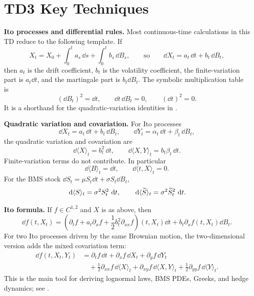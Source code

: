 \section{TD3 Key Techniques}

\begin{techniques}
  \item \textbf{Ito processes and differential rules.}
  Most continuous-time calculations in this TD reduce to the following
  template.  If
  \[
    X_t=X_0+\int_0^t a_s\,\dd s+\int_0^t b_s\,\dd B_s,
    \qquad\text{so}\qquad
    \dd X_t=a_t\,\dd t+b_t\,\dd B_t,
  \]
  then \(a_t\) is the drift coefficient, \(b_t\) is the volatility
  coefficient, the finite-variation part is \(a_t\dd t\), and the martingale
  part is \(b_t\dd B_t\).  The symbolic multiplication table is
  \[
    (\dd B_t)^2=\dd t,\qquad \dd t\,\dd B_t=0,\qquad (\dd t)^2=0.
  \]
  It is a shorthand for the quadratic-variation identities in
  .

  \item \textbf{Quadratic variation and covariation.}
  For Ito processes
  \[
    \dd X_t=a_t\,\dd t+b_t\,\dd B_t,\qquad
    \dd Y_t=\alpha_t\,\dd t+\beta_t\,\dd B_t,
  \]
  the quadratic variation and covariation are
  \[
    \dd\langle X\rangle_t=b_t^2\,\dd t,\qquad
    \dd\langle X,Y\rangle_t=b_t\beta_t\,\dd t.
  \]
  Finite-variation terms do not contribute.  In particular
  \[
    \dd\langle B\rangle_t=\dd t,\qquad
    \dd\langle t,X\rangle_t=0.
  \]
  For the BMS stock
  \(\dd S_t=\mu S_t\dd t+\sigma S_t\dd B_t\),
  \[
    \,\mathrm{d}\langle S\rangle_t=\sigma^2S_t^2\,\,\mathrm{d} t,
    \qquad
    \,\mathrm{d}\langle \widetilde S\rangle_t=\sigma^2\widetilde S_t^2\,\,\mathrm{d} t.
  \]

  \item \textbf{Ito formula.}
  If \(f\in C^{1,2}\) and \(X\) is as above, then
  \[
    \dd f(t,X_t)
      =
      \left(\partial_t f+a_t\partial_x f
        +\frac12b_t^2\partial_{xx}f\right)(t,X_t)\dd t
      +b_t\partial_x f(t,X_t)\dd B_t.
  \]
  For two Ito processes driven by the same Brownian motion, the
  two-dimensional version adds the mixed covariation term:
  \[
  \begin{aligned}
    \dd f(t,X_t,Y_t)
      &=\partial_t f\,\dd t+\partial_x f\,\dd X_t+\partial_y f\,\dd Y_t\\
      &\quad+\frac12\partial_{xx}f\,\dd\langle X\rangle_t
        +\partial_{xy}f\,\dd\langle X,Y\rangle_t
        +\frac12\partial_{yy}f\,\dd\langle Y\rangle_t.
  \end{aligned}
  \]
  This is the main tool for deriving lognormal laws, BMS PDEs, Greeks, and
  hedge dynamics; see .


\end{techniques}
